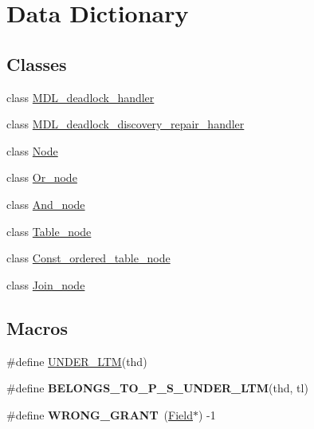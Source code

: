 \hypertarget{group__Data__Dictionary}{}\section{Data Dictionary}
\label{group__Data__Dictionary}
\subsection*{Classes}
\begin{DoxyCompactItemize}
\item 
class \mbox{\hyperlink{classMDL__deadlock__handler}{M\+D\+L\+\_\+deadlock\+\_\+handler}}
\item 
class \mbox{\hyperlink{classMDL__deadlock__discovery__repair__handler}{M\+D\+L\+\_\+deadlock\+\_\+discovery\+\_\+repair\+\_\+handler}}
\item 
class \mbox{\hyperlink{classNode}{Node}}
\item 
class \mbox{\hyperlink{classOr__node}{Or\+\_\+node}}
\item 
class \mbox{\hyperlink{classAnd__node}{And\+\_\+node}}
\item 
class \mbox{\hyperlink{classTable__node}{Table\+\_\+node}}
\item 
class \mbox{\hyperlink{classConst__ordered__table__node}{Const\+\_\+ordered\+\_\+table\+\_\+node}}
\item 
class \mbox{\hyperlink{classJoin__node}{Join\+\_\+node}}
\end{DoxyCompactItemize}
\subsection*{Macros}
\begin{DoxyCompactItemize}
\item 
\#define \mbox{\hyperlink{group__Data__Dictionary_gae383b8742be40b62c710380f1b5e6a6e}{U\+N\+D\+E\+R\+\_\+\+L\+TM}}(thd)
\item 
\#define {\bfseries B\+E\+L\+O\+N\+G\+S\+\_\+\+T\+O\+\_\+\+P\+\_\+\+S\+\_\+\+U\+N\+D\+E\+R\+\_\+\+L\+TM}(thd,  tl)
\item 
\mbox{\label{group__Data__Dictionary_ga9103f1fde040b45e171c6df146d812f1}} 
\#define {\bfseries W\+R\+O\+N\+G\+\_\+\+G\+R\+A\+NT}~(\mbox{\hyperlink{classField}{Field}}$\ast$) -\/1
\end{DoxyCompactItemize}
